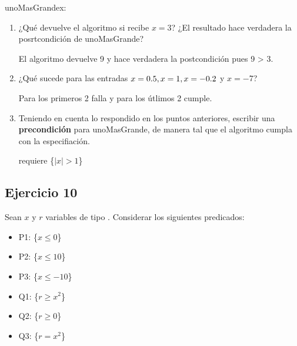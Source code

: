 \begin{proc}{unoMasGrande}{\In x: \float}{\float}
\end{proc}

\begin{enumerate}[label=\alph*)]
      \item ¿Qué devuelve el algoritmo si recibe $x = 3$? ¿El resultado hace verdadera la posrtcondición de unoMasGrande?

            El algoritmo devuelve 9 y hace verdadera la postcondición pues 9 > 3.

      \item ¿Qué sucede para las entradas $x = 0\text{.}5, x = 1, x = -0\text{.}2$ y $x = -7$?

            Para los primeros 2 falla y para los útlimos 2 cumple.

      \item Teniendo en cuenta lo respondido en los puntos anteriores, escribir una \textbf{precondición} para unoMasGrande, de manera tal que el algoritmo cumpla con la especifiación.

            requiere \{$|x| > 1$\}
\end{enumerate}

\subsection{Ejercicio 10}
Sean $x$ y $r$ variables de tipo \float. Considerar los siguientes predicados:

\begin{multicols}{2}
      \begin{itemize}
            \item P1: \{$x \leq 0$\}
            \item P2: \{$x \leq 10$\}
            \item P3: \{$x \leq -10$\}
            \item Q1: \{$r \geq x^2$\}
            \item Q2: \{$r \geq 0$\}
            \item Q3: \{$r = x^2$\}
      \end{itemize}
\end{multicols}

